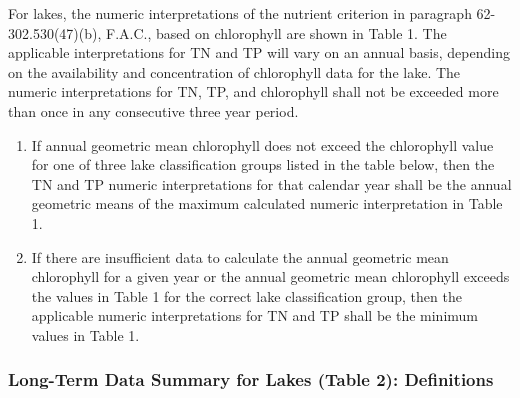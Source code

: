 \documentclass[
]{article}
\begin{document}
For lakes, the numeric interpretations of the nutrient criterion in
paragraph 62-302.530(47)(b), F.A.C., based on chlorophyll are shown in
Table 1. The applicable interpretations for TN and TP will vary on an
annual basis, depending on the availability and concentration of
chlorophyll data for the lake. The numeric interpretations for TN, TP,
and chlorophyll shall not be exceeded more than once in any consecutive
three year period.

\begin{enumerate}
\def\labelenumi{\alph{enumi}.}
\item
  If annual geometric mean chlorophyll does not exceed the chlorophyll
  value for one of three lake classification groups listed in the table
  below, then the TN and TP numeric interpretations for that calendar
  year shall be the annual geometric means of the maximum calculated
  numeric interpretation in Table 1.
\item
  If there are insufficient data to calculate the annual geometric mean
  chlorophyll for a given year or the annual geometric mean chlorophyll
  exceeds the values in Table 1 for the correct lake classification
  group, then the applicable numeric interpretations for TN and TP shall
  be the minimum values in Table 1.
\end{enumerate}

\hypertarget{long-term-data-summary-for-lakes-table-2-definitions}{%
\subsubsection{Long-Term Data Summary for Lakes (Table 2):
Definitions}\label{long-term-data-summary-for-lakes-table-2-definitions}}
\end{document}
